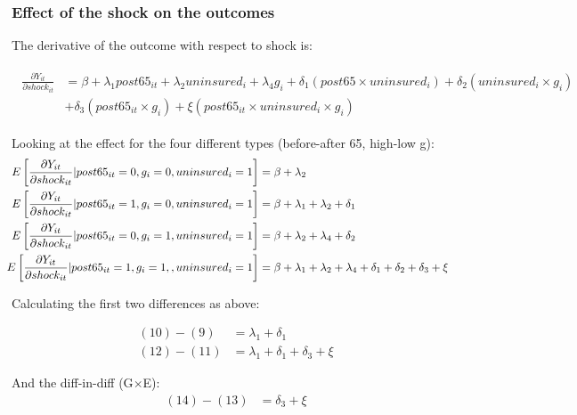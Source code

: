 \documentclass[10pt,compress,xcolor=dvipsnames,aspectratio=169]{beamer}    %
\newcommand{\1}[1]{\mathrm{1\hspace*{-2.5pt}l}[#1]}	%
\begin{document}
\begin{frame}
\frametitle{Effect of the shock on the outcomes} \label{frame:shockmath}
The derivative of the outcome with respect to shock is:

\begin{footnotesize}
\begin{align}
\begin{aligned}
	\frac{\partial Y_{it}}{\partial shock_{it}}&=\beta+\lambda_1post65_{it}+\lambda_2uninsured_{i}+\lambda_4g_i+\delta_1(post65 \times uninsured_i)+\delta_2(uninsured_i \times g_i) \\
	&+\delta_3(post65_{it} \times g_i)+\xi(post65_{it} \times uninsured_i \times g_i)
\end{aligned}
\end{align}

Looking at the effect for the four different types (before-after 65, high-low g):
\begin{align}
\phantom{E\left[ \frac{\partial Y_{it}}{\partial shock_{it}}| post65_{it}=1, g_i=1,uninsured_i=1\right]}
&\begin{aligned}
\mathllap{E\left[ \frac{\partial Y_{it}}{\partial shock_{it}}| post65_{it}=0, g_i=0,uninsured_i=1\right]} &=\beta+\lambda_2
\end{aligned}\\
&\begin{aligned}
\mathllap{E\left[ \frac{\partial Y_{it}}{\partial shock_{it}}| post65_{it}=1, g_i=0,uninsured_i=1\right]} &=\beta+\lambda_1+\lambda_2+\delta_1
\end{aligned}\\
&\begin{aligned}
\mathllap{E\left[ \frac{\partial Y_{it}}{\partial shock_{it}}| post65_{it}=0, g_i=1,uninsured_i=1\right]} &=\beta+\lambda_2+\lambda_4+\delta_2
\end{aligned}\\
&\begin{aligned}
\mathllap{E\left[ \frac{\partial Y_{it}}{\partial shock_{it}}| post65_{it}=1, g_i=1,,uninsured_i=1\right]} &=\beta+\lambda_1+\lambda_2+\lambda_4+\delta_1+\delta_2+\delta_3+\xi
\end{aligned}
\end{align}

Calculating the first two differences as above:

\begin{align}
(10)-(9)&=\lambda_1+\delta_1\\
(12)-(11)&=\lambda_1+\delta_1+\delta_3+\xi
\end{align}

And the diff-in-diff (G$\times$E):
\begin{align}
(14)-(13)&=\delta_3+\xi
\end{align}
\end{footnotesize}

\end{frame}
\end{document}
